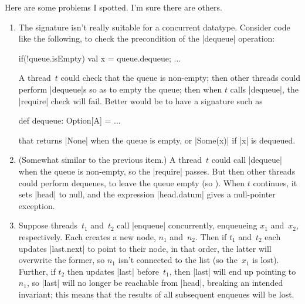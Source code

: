 
\begin{answerI}
Here are some problems I spotted.  I'm sure there are others.
\begin{enumerate}
\item
The signature isn't really suitable for a concurrent datatype.  Consider code
like the following, to check the precondition of the |dequeue| operation:
%
\begin{scala}
  if(!queue.isEmpty){ val x = queue.dequeue; ... }
\end{scala}
%
A thread~$t$ could check that the queue is non-empty; then other threads could
perform |dequeue|s so as to empty the queue; then when $t$ calls |dequeue|,
the |require| check will fail.  Better would be to have a signature such as
\begin{scala}
  def dequeue: Option[A] = ...
\end{scala}
that returns |None| when the queue is empty, or |Some(x)| if |x| is dequeued.


\item (Somewhat similar to the previous item.)  A thread~$t$ could call
  |dequeue| when the queue is non-empty, so the |require| passes.  But then
  other threads could perform dequeues, to leave the queue empty (so
  ).  When $t$ continues, it sets |head| to null, and
  the expression |head.datum| gives a null-pointer exception.


\item Suppose threads~$t_1$ and~$t_2$ call |enqueue| concurrently, enqueueing
  $x_1$ and~$x_2$, respectively.  Each creates a new node, $n_1$ and~$n_2$.
  Then if $t_1$ and~$t_2$ each updates |last.next| to point to their node, in
  that order, the latter will overwrite the former, so $n_1$ isn't connected
  to the list (so the~$x_1$ is lost).  Further, if $t_2$ then updates |last|
  before~$t_1$, then |last| will end up pointing to~$n_1$, so |last| will no
  longer be reachable from |head|, breaking an intended invariant; this means
  that the results of all subsequent enqueues will be lost.


\end{enumerate}
\end{answerI}
